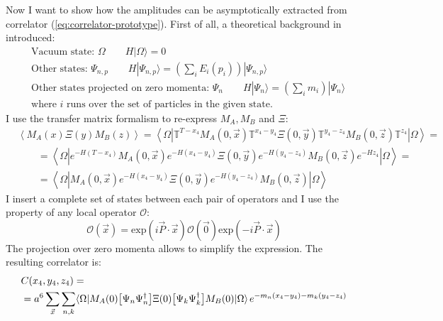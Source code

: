 \documentclass[english, LaM, oneside, noexaminfo]{sapthesis}
\newcommand{\la}{\langle}
\newcommand{\ra}{\rangle}
\begin{document}
\newline
Now I want to show how the amplitudes can be asymptotically extracted \cite{montvay-munster} from correlator (\ref{eq:correlator-prototype}).
First of all, a theoretical background in introduced:
\begin{equation*}
    \begin{split}
        & \text{Vacuum state: } \Omega \qquad H|\Omega\ra = 0 \\
        & \text{Other states: } \Psi_{n,p} \qquad H|\Psi_{n,p}\ra = \left(\sum_i E_i(p_i)\right)|\Psi_{n,p}\ra \\
        & \text{Other states projected on zero momenta: } \Psi_{n} \qquad H|\Psi_{n}\ra = \left(\sum_i m_i\right)|\Psi_{n}\ra \\
        & \text{where $i$ runs over the set of particles in the given state.}
    \end{split}
\end{equation*}
I use the transfer matrix formalism to re-express $M_A, M_B$ and $\Xi$:
\begin{equation*}
    \begin{split}
        & \left\la M_A (x)\Xi (y)M_B (z) \right\ra = \left\la \Omega | \mathbb{T}^{T-x_4} M_A (0,\vec x) \mathbb{T}^{x_4-y_4} \Xi (0,\vec y) \mathbb{T}^{y_4-z_4} M_B (0,\vec z) \mathbb{T}^{z_4} | \Omega \right\ra = \\
        & \qquad = \left\la \Omega | e^{-H(T-x_4)} M_A (0,\vec x) e^{-H(x_4-y_4)} \Xi (0,\vec y) e^{-H(y_4-z_4)} M_B (0,\vec z) e^{-Hz_4} | \Omega \right\ra = \\
        & \qquad = \left\la \Omega | M_A (0,\vec x) e^{-H(x_4-y_4)} \Xi (0,\vec y) e^{-H(y_4-z_4)} M_B (0,\vec z) | \Omega \right\ra
    \end{split}
\end{equation*}
I insert a complete set of states between each pair of operators and I use the property of any local operator $\mathcal{O}$:
$$\mathcal{O}(\vec x) = \text{exp}\left(i \vec P \cdot \vec x\right)\mathcal{O}(\vec 0)\text{exp}\left(-i \vec P \cdot \vec x\right)$$
The projection over zero momenta allows to simplify the expression.
The resulting correlator is:
\begin{equation*}
    \begin{split}
        & C(x_4,y_4,z_4) = \\
        & = a^6\sum_{\vec x}\sum_{n,k} \la \Omega | M_A (0) \big[\Psi_n \Psi_n^\dag \big] \Xi (0) \big[\Psi_k \Psi_k^\dag \big] M_B (0) | \Omega \ra \hspace*{0.5mm} e^{-m_n(x_4-y_4)-m_k(y_4-z_4)}
    \end{split}
\end{equation*}
\end{document}
